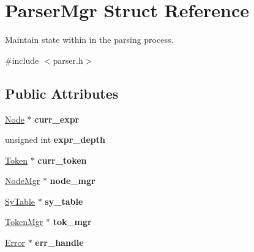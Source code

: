 \hypertarget{struct_parser_mgr}{}\section{Parser\+Mgr Struct Reference}
\label{struct_parser_mgr}


Maintain state within in the parsing process.  




{\ttfamily \#include $<$parser.\+h$>$}

\subsection*{Public Attributes}
\begin{DoxyCompactItemize}
\item 
\mbox{\label{struct_parser_mgr_a50b337b2185017f943a7ce0a7dc7e8f9}} 
\mbox{\hyperlink{struct_node}{Node}} $\ast$ {\bfseries curr\+\_\+expr}
\item 
\mbox{\label{struct_parser_mgr_ac10dc0846d693c106a2620b2906ed729}} 
unsigned int {\bfseries expr\+\_\+depth}
\item 
\mbox{\label{struct_parser_mgr_a2f91e648f300891d40e0fb2b903789c0}} 
\mbox{\hyperlink{struct_token}{Token}} $\ast$ {\bfseries curr\+\_\+token}
\item 
\mbox{\label{struct_parser_mgr_a7027cf6feef6cb82c56e84fe0fbb74ba}} 
\mbox{\hyperlink{struct_node_mgr}{Node\+Mgr}} $\ast$ {\bfseries node\+\_\+mgr}
\item 
\mbox{\label{struct_parser_mgr_a62ecf294cfb5f6a769eb7602448da454}} 
\mbox{\hyperlink{struct_sy_table}{Sy\+Table}} $\ast$ {\bfseries sy\+\_\+table}
\item 
\mbox{\label{struct_parser_mgr_a2f758482ba8935ae5709f66d4295d320}} 
\mbox{\hyperlink{struct_token_mgr}{Token\+Mgr}} $\ast$ {\bfseries tok\+\_\+mgr}
\item 
\mbox{\label{struct_parser_mgr_a35287ee719c8ac8f666cc8ebc2ac7003}} 
\mbox{\hyperlink{struct_error}{Error}} $\ast$ {\bfseries err\+\_\+handle}
\end{DoxyCompactItemize}


